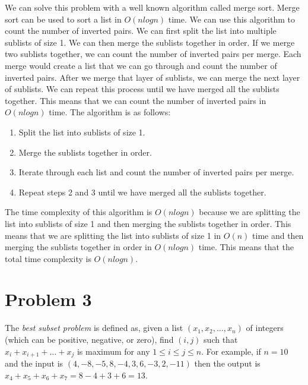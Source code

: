 \documentclass[12pt,letterpaper]{article}
\begin{document}
We can solve this problem with a well known algorithm called merge sort.
Merge sort can be used to sort a list in $O(n log n)$ time. We can use this
algorithm to count the number of inverted pairs. We can first split the list
into multiple sublists of size 1. We can then merge the sublists together in
order. If we merge two sublists together, we can count the number of inverted
pairs per merge. Each merge would create a list that we can go through and count
the number of inverted pairs. After we merge that layer of sublists, we can
merge the next layer of sublists. We can repeat this process until we have
merged all the sublists together. This means that we can count the number of
inverted pairs in $O(n log n)$ time. The algorithm is as follows:
\begin{enumerate}
    \item Split the list into sublists of size 1.
    \item Merge the sublists together in order.
    \item Iterate through each list and count the number of inverted pairs per merge.
    \item Repeat steps 2 and 3 until we have merged all the sublists together.
\end{enumerate}

The time complexity of this algorithm is $O(n log n)$ because we are splitting the list into sublists
of size 1 and then merging the sublists together in order. This means that we are splitting the list
into sublists of size 1 in $O(n)$ time and then merging the sublists together in order in $O(n log n)$
time. This means that the total time complexity is $O(n log n)$.

\pagebreak

\section*{Problem 3}
The \textit{best subset problem} is defined as, given a list $(x_1, x_2, \ldots , x_n)$ of integers 
(which can be positive, negative, or zero), find $(i, j)$ such that $x_i + x_{i+1} + \ldots + x_j$ is 
maximum for any $1 \leq i \leq j \leq n.$ For example, if $n = 10$ and the input is $(4, -8, -5, 8, -4, 3, 6, -3, 2, -11)$ 
then the output is $x_4 + x_5 + x_6 + x_7 = 8 - 4 + 3 + 6 = 13.$
\end{document}
